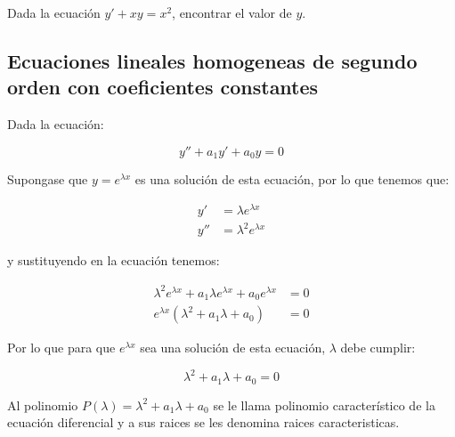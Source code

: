 \begin{enumerate}
			\begin{ejercicio}
				Dada la ecuación $y' + xy = x^2$, encontrar el valor de $y$.
			\end{ejercicio}
		\end{enumerate}

	\newpage
	\subsection{Ecuaciones lineales homogeneas de segundo orden con coeficientes constantes}

		Dada la ecuación:

		\begin{equation}
			y'' + a_1 y' + a_0 y = 0
		\end{equation}

		Supongase que $y = e^{\lambda x}$ es una solución de esta ecuación, por lo que tenemos que: 

		\begin{align*}
			y' &= \lambda e^{\lambda x} \\
			y'' &= \lambda^2 e^{\lambda x}
		\end{align*}

		y sustituyendo en la ecuación tenemos:

		\begin{align*}
			\lambda^2 e^{\lambda x} + a_1 \lambda e^{\lambda x} + a_0 e^{\lambda x} &= 0 \\
			e^{\lambda x} (\lambda^2 + a_1 \lambda + a_0) &= 0
		\end{align*}

		Por lo que para que $e^{\lambda x}$ sea una solución de esta ecuación, $\lambda$ debe cumplir:

		\begin{equation*}
			\lambda^2 + a_1 \lambda + a_0 = 0
		\end{equation*}

		\begin{definicion}
			Al polinomio $P(\lambda) = \lambda^2 + a_1 \lambda + a_0$ se le llama polinomio característico de la ecuación diferencial y a sus raices se les denomina raices caracteristicas.
		\end{definicion}

